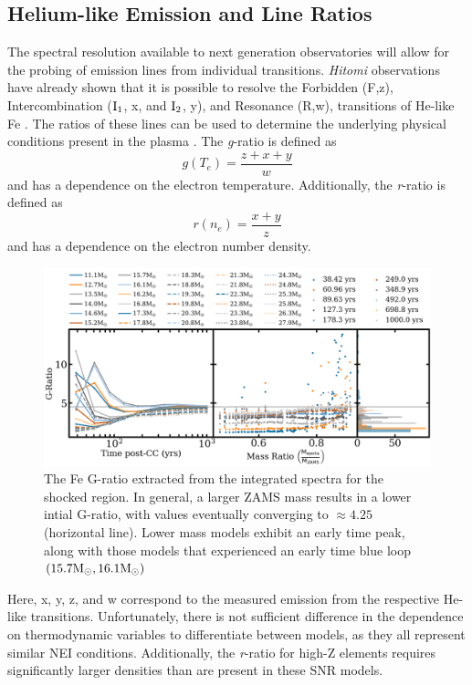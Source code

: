 \documentclass[twocolumn]{aastex631}
\begin{document}
\subsection{Helium-like Emission and Line Ratios}
\label{helikeem}
The spectral resolution available to next generation observatories will allow for the probing of emission lines from individual transitions. \textit{Hitomi} observations have already shown that it is possible to resolve the Forbidden (F,z), Intercombination ($\rm I_{1}$, x, and $\rm I_{2}$, y), and Resonance (R,w), transitions of He-like Fe \citep{hehitomi}. The ratios of these lines can be used to determine the underlying physical conditions present in the plasma \citep{porquet10}. The \textit{g}-ratio is defined as
\begin{equation}
    g\left(T_e \right) =\frac{z+x+y}{w}
\end{equation}
and has a dependence on the electron temperature. Additionally, the \textit{r}-ratio is defined as
\begin{equation}
    r\left(n_e \right) =\frac{x+y}{z}
\end{equation}
and has a dependence on the electron number density. 
\begin{figure}[htb]
    \centering
    \includegraphics[scale=0.32]{g_ratio_fe.png}
    \caption{The Fe G-ratio extracted from the integrated spectra for the shocked region. In general, a larger ZAMS mass results in a lower intial G-ratio, with values eventually converging to $\approx 4.25$ (horizontal line). Lower mass models exhibit an early time peak, along with those models that experienced an early time blue loop $(15.7 \rm M_{\odot}, 16.1 \rm M_{\odot})$}
    \label{fig:g-fe}
\end{figure} Here, x, y, z, and w correspond to the measured emission from the respective He-like transitions. Unfortunately, there is not sufficient difference in the dependence on thermodynamic variables to differentiate between models, as they all represent similar NEI conditions. Additionally, the \textit{r}-ratio for high-Z elements requires significantly larger densities than are present in these SNR models. 
\end{document}
